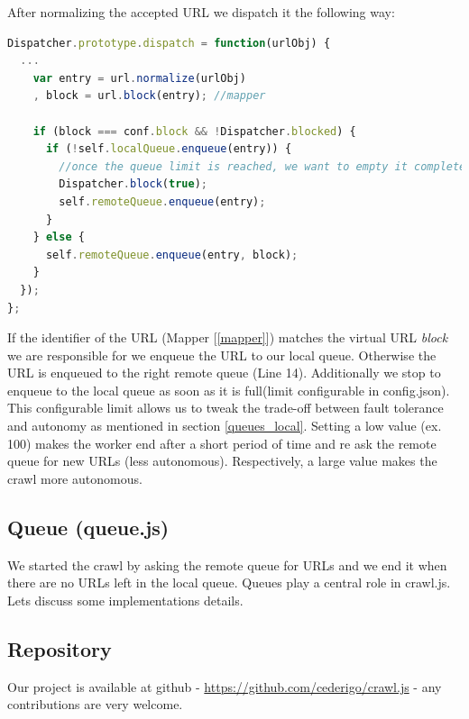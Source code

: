 After normalizing the accepted URL we dispatch it the following way:

\begin{lstlisting}[language=JavaScript]
Dispatcher.prototype.dispatch = function(urlObj) {
  ...
    var entry = url.normalize(urlObj)
    , block = url.block(entry); //mapper

    if (block === conf.block && !Dispatcher.blocked) {
      if (!self.localQueue.enqueue(entry)) {
        //once the queue limit is reached, we want to empty it completely
        Dispatcher.block(true);
        self.remoteQueue.enqueue(entry);
      }
    } else {
      self.remoteQueue.enqueue(entry, block);
    }
  });
};
\end{lstlisting}

If the identifier of the URL (Mapper [\ref{mapper}]) matches the virtual URL \emph{block} we are responsible for we enqueue the URL to our local queue. Otherwise the URL is enqueued to the right remote queue (Line 14). Additionally we stop to enqueue to the local queue as soon as it is full(limit configurable in config.json). This configurable limit allows us to tweak the trade-off between fault tolerance and autonomy as mentioned in section \ref{queues_local}. Setting a low value (ex. 100) makes the worker end after a short period of time and re ask the remote queue for new URLs (less autonomous). Respectively, a large value makes the crawl more autonomous.

\subsection{Queue (queue.js)}
We started the crawl by asking the remote queue for URLs and we end it when there are no URLs left in the local queue. Queues play a central role in crawl.js. Lets discuss some implementations details.

\subsection{Repository}
Our project is available at github - \url{https://github.com/cederigo/crawl.js} - any contributions are very welcome.
